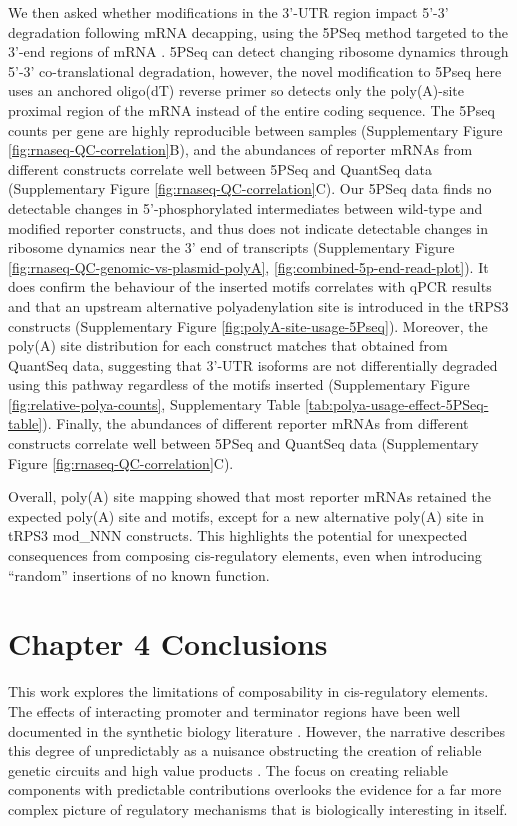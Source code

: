 \documentclass[../main.tex]{subfiles}
\begin{document}
We then asked whether modifications in the 3'-UTR region impact 5'-3' degradation following mRNA decapping, using the 5PSeq method targeted to the 3'-end regions of mRNA \parencite{Pelechano2016}.
5PSeq can detect changing ribosome dynamics through 5'-3' co-translational degradation, however, the novel modification to 5Pseq here uses an anchored oligo(dT) reverse primer so detects only the poly(A)-site proximal region of the mRNA instead of the entire coding sequence.
The 5Pseq counts per gene are highly reproducible between samples (Supplementary Figure \ref{fig:rnaseq-QC-correlation}B), and the abundances of reporter mRNAs from different constructs correlate well between 5PSeq and QuantSeq data (Supplementary Figure \ref{fig:rnaseq-QC-correlation}C).
Our 5PSeq data finds no detectable changes in 5'-phosphorylated intermediates between wild-type and modified reporter constructs, and thus does not indicate detectable changes in ribosome dynamics near the 3' end of transcripts (Supplementary Figure \ref{fig:rnaseq-QC-genomic-vs-plasmid-polyA}, \ref{fig:combined-5p-end-read-plot}).
It does confirm the behaviour of the inserted motifs correlates with qPCR results and that an upstream alternative polyadenylation site is introduced in the tRPS3 constructs (Supplementary Figure \ref{fig:polyA-site-usage-5Pseq}).
Moreover, the poly(A) site distribution for each construct matches that obtained from QuantSeq data, suggesting that 3'-UTR isoforms are not differentially degraded using this pathway regardless of the motifs inserted (Supplementary Figure \ref{fig:relative-polya-counts}, Supplementary Table \ref{tab:polya-usage-effect-5PSeq-table}).
Finally, the abundances of different reporter mRNAs from different constructs correlate well between
5PSeq and QuantSeq data (Supplementary Figure \ref{fig:rnaseq-QC-correlation}C).

Overall, poly(A) site mapping showed that most reporter mRNAs retained the expected poly(A) site and motifs, except for a new alternative poly(A) site in tRPS3 mod\_NNN constructs.
This highlights the potential for unexpected consequences from composing cis-regulatory elements, even when introducing ``random'' insertions of no known function.


\section{Chapter 4 Conclusions}

This work explores the limitations of composability in cis-regulatory elements. 
The effects of interacting promoter and terminator regions have been well documented in the synthetic biology literature \parencite{Ito2013, Dhillon2020}. 
However, the narrative describes this degree of unpredictably as a nuisance obstructing the creation of reliable genetic circuits and high value products \parencite{Kittleson2012}. 
The focus on creating reliable components with predictable contributions overlooks the evidence for a far more complex picture of regulatory mechanisms that is biologically interesting in itself. 
\end{document}
